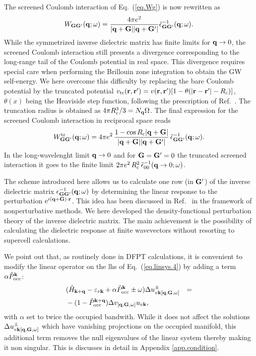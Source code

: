 \documentclass[twocolumn,prb,showpacs,superscriptaddress]{revtex4}
\def\w{\omega}
\def\H{\hat{H}}
\def\P{\hat{P}_{\rm occ}}
\def\E{\varepsilon}
\def\q{{\bf q}}
\def\k{{\bf k}}
\def\G{{\bf G}}
\def\Gp{{\bf G^\prime}}
\def\r{{\bf r}}
\def\rp{{\bf r^\prime}}
\begin{document}
The screened Coulomb interaction of Eq.\ (\ref{eq.Wg}) is now rewritten as
  \begin{equation}\label{eq.Wg_symm}
  W_{\G\Gp}(\q;\w) = \frac{4\pi e^2}{|\q+\G||\q+\Gp|}  \tilde\epsilon^{-1}_{\G\Gp}(\q;\w).
  \end{equation}
While the symmetrized inverse dielectric matrix has finite limits for $\q\rightarrow 0$,
the screened Coulomb interaction still presents a divergence corresponding to the
long-range tail of the Coulomb potential in real space. This divergence requires special
care when performing the Brillouin zone integration to obtain the GW self-energy.\cite{hl86}
We here overcome this difficulty by replacing the bare Coulomb potential 
by the truncated potential $v_{\rm tr}(\r,\rp)=v(\r,\rp)[1-\theta(|\r-\rp|-R_{\rm c})]$, $\theta(x)$ being the Heaviside step function, following the prescription of 
Ref.~. The truncation radius is obtained as 
$4\pi R_{\rm c}^3/3=N_\q\Omega$. The final expression for the
screened Coulomb interaction in reciprocal space reads
  \begin{equation}\label{eq.Wg_symm}
  W^{\rm tr}_{\G\Gp}(\q;\w) = 4\pi e^2 \, \frac{1-\cos{R_{\rm c}|\q+\G|}}{|\q+\G||\q+\Gp|}\,
     \tilde\epsilon^{-1}_{\G\Gp}(\q;\w).
  \end{equation}
In the long-wavelenght limit $\q\rightarrow 0$ and for $\G=\Gp=0$ the truncated
screened interaction it goes to
the finite limit $2\pi e^2 \, R_{\rm c}^2 \, \tilde\epsilon^{-1}_{00}(\q\rightarrow 0;\w)$.

The scheme introduced here allows us to calculate one row (in $\Gp$) of the inverse dielectric
matrix $\epsilon^{-1}_{\G\Gp}(\q;\w)$ by determining the linear response to the
perturbation ${\rm e}^{i(\q+\G)\cdot\r}$. This idea has been discussed in Ref.\ 
in the framework of nonperturbative methods. We here developed the density-functional
perturbation theory of the inverse dielectric matrix. The main achievement is the
possibility of calculating the dielectric response at finite wavevectors without
resorting to supercell calculations.


  

We point out that, as routinely done in DFPT calculations, 
it is convenient to modify the linear operator on the lhs of Eq.\ (\ref{eq.linsys.4}) by adding
a term $\alpha \P^\k$:
 \begin{eqnarray} \label{eq.linsys.5}
&  (\H_{\k+\q}-\E_{v\k}+\alpha\P^\k \pm\w) \Delta u^\pm_{v\k[\q,\G,\w]}  & = \nonumber \\
&   -(1-\P^{\k+\q}) \Delta v_{[\q,\G,\w]} u_{v\k}, & 
  \end{eqnarray}
with $\alpha$ set to twice the occupied bandwith.
While it does not affect the solutions $\Delta u^\pm_{v\k[\q,\G,\w]}$ which have
vanishing projections on the occupied manifold, this additional term removes
the null eigenvalues of the linear system thereby making it non singular.
This is discusses in detail in Appendix \ref{app.condition}.
\end{document}

